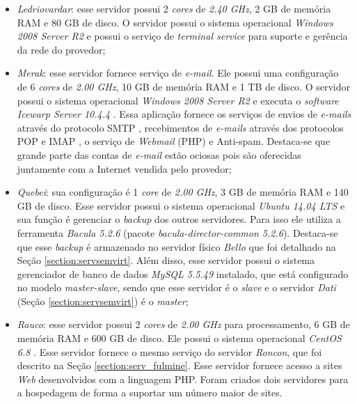 \begin{itemize}
 \item \textit{Ledriovardar}: esse servidor possui 2 \textit{cores} de \textit{2.40 GHz}, 2 GB de memória \ac{RAM} e 80 GB de disco. 
 O servidor possui o sistema operacional \textit{Windows 2008 Server R2} e possui o serviço de \textit{terminal service} para suporte e gerência 
 da rede do provedor;
 
 \item \textit{Merak}: esse servidor fornece serviço de \textit{e-mail}. Ele possui uma configuração de 6 \textit{cores} de \textit{2.00 GHz}, 
 10 GB de memória \ac{RAM} e 1 TB de disco. O servidor possui o sistema operacional \textit{Windows 2008 Server R2} e executa o \textit{software} 
 \textit{Icewarp Server 10.4.4} \cite{icewarp}. Essa aplicação fornece os serviços de envios de \textit{e-mails} através do protocolo 
 \ac{SMTP} \cite{kurose2006}, recebimentos de \textit{e-mails} através dos protocolos \ac{POP} \cite{kurose2006} e \ac{IMAP} \cite{kurose2006}, 
 o serviço de \textit{Webmail} (\ac{PHP}) e Anti-spam. Destaca-se que grande parte das contas de \textit{e-mail} estão ociosas pois são oferecidas 
 juntamente com a Internet vendida pelo provedor;
 
 \item \textit{Quebei}: sua configuração é 1 \textit{core} de \textit{2.00 GHz}, 3 GB de memória \ac{RAM} e 140 GB de disco. 
 Esse servidor possui o sistema operacional \textit{Ubuntu 14.04 \ac{LTS}} \cite{ubuntu} e sua função é gerenciar o \textit{backup} dos outros 
 servidores. Para isso ele utiliza a ferramenta \textit{Bacula 5.2.6} \cite{bacula} (pacote \textit{bacula-director-common 5.2.6}). Destaca-se
 que esse \textit{backup} é armazenado no servidor físico \textit{Bello} que foi detalhado na Seção \ref{section:servsemvirt}. Além disso, 
 esse servidor possui o sistema gerenciador de banco de dados \textit{MySQL 5.5.49} \cite{mysql} instalado, que está configurado no modelo 
 \textit{master-slave}, sendo que esse servidor é o \textit{slave} e o servidor \textit{Dati} (Seção \ref{section:servsemvirt}) é o \textit{master};
 
 \item \textit{Rauco}: esse servidor possui 2 \textit{cores} de \textit{2.00 GHz} para processamento, 6 GB de memória \ac{RAM} e 600 GB de disco. 
 Ele possui o sistema operacional \textit{CentOS 6.8} \cite{centos}. Esse servidor fornece o mesmo serviço do servidor \textit{Roncon}, 
 que foi descrito na Seção \ref{section:serv_fulmine}. Esse servidor fornece acesso a sites \textit{Web} desenvolvidos com a linguagem \ac{PHP}. 
 Foram criados dois servidores para a hospedagem de forma a suportar um número maior de sites.
\end{itemize}

